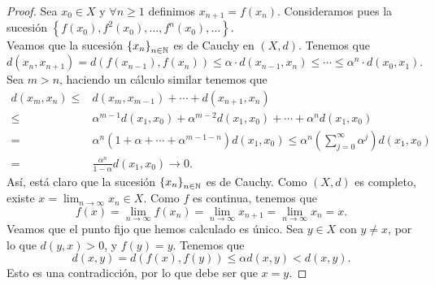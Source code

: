 \begin{proof}
	Sea $\displaystyle x_{0} \in X $ y $\displaystyle \forall n \geq 1 $ definimos $\displaystyle x_{n+1} = f\left(x_{n}\right) $. Consideramos pues la sucesión $\displaystyle \left\{ f\left(x_{0}\right), f^{2}\left(x_{0}\right), \ldots, f^{n}\left(x_{0}\right), \ldots\right\}  $. \\
 Veamos que la sucesión $\displaystyle \left\{ x_{n}\right\} _{n\in\mathbb{N}} $ es de Cauchy en $\displaystyle \left(X,d\right) $. Tenemos que 
			\[d\left(x_{n}, x_{n+1}\right) = d\left(f\left(x_{n-1}\right), f\left(x_{n}\right)\right) \leq \alpha \cdot d\left(x_{n-1}, x_{n}\right) \leq \cdots \leq \alpha^{n} \cdot d\left(x_{0}, x_{1}\right) .\]
		Sea $\displaystyle m > n $, haciendo un cálculo similar tenemos que
		\[
		\begin{split}
			d\left(x_{m}, x_{n}\right) \leq & d\left(x_{m}, x_{m - 1}\right) + \cdots + d\left(x_{n+1}, x_{n}\right) \\
			\leq & \alpha ^{m - 1} d\left(x_{1}, x_{0}\right) + \alpha^{m - 2}d\left(x_{1}, x_{0}\right) + \cdots + \alpha^{n}d\left(x_{1}, x_{0}\right) \\
			= & \alpha^{n}\left(1 + \alpha + \cdots + \alpha^{m - 1 - n}\right)d\left(x_{1}, x_{0}\right) \leq \alpha^{n}\left(\sum^{\infty}_{j = 0}\alpha^{j}\right)d\left(x_{1}, x_{0}\right)\\
			= & \frac{\alpha^{n}}{1-\alpha }d\left(x_{1}, x_{0}\right) \to 0.
		\end{split}
		\]
		Así, está claro que la sucesión $\displaystyle \left\{ x_{n}\right\} _{n\in\mathbb{N}} $ es de Cauchy. 
Como $\displaystyle \left(X,d\right) $ es completo, existe $\displaystyle x = \lim_{n \to \infty}x_{n} \in X $. Como $\displaystyle f $ es continua, tenemos que  
		\[ f\left(x\right) = \lim_{n \to \infty}f\left(x_{n}\right) = \lim_{n \to \infty}x_{n+1} = \lim_{n \to \infty}x_{n} = x.\]
Veamos que el punto fijo que hemos calculado es único. Sea $\displaystyle y \in X $ con $\displaystyle y \neq x $, por lo que $\displaystyle d\left(y,x\right) > 0 $, y $\displaystyle f\left(y\right) = y $. Tenemos que
		\[d\left(x,y\right) = d\left(f\left(x\right), f\left(y\right)\right) \leq \alpha d\left(x,y\right) < d\left(x,y\right) .\]
		Esto es una contradicción, por lo que debe ser que $\displaystyle x =y $.
\end{proof}

